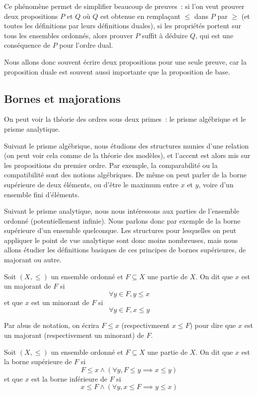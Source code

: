 Ce phénomène permet de simplifier beaucoup de preuves~: si l'on veut prouver
deux propositions $P$ et $Q$ où $Q$ est obtenue en remplaçant $\leq$ dans $P$
par $\geq$ (et toutes les définitions par leurs définitions duales), si les
propriétés portent sur tous les ensembles ordonnés, alors prouver $P$ suffit à
déduire $Q$, qui est une conséquence de $P$ pour l'ordre dual.

Nous allons donc souvent écrire deux propositions pour une seule preuve, car la
proposition duale est souvent aussi importante que la proposition de base.

\subsection{Bornes et majorations}

On peut voir la théorie des ordres sous deux primes~: le prisme algébrique et le
prisme analytique.

Suivant le prisme algébrique, nous étudions des structures
munies d'une relation (on peut voir cela comme de la théorie des modèles), et
l'accent est alors mis sur les propositions du premier ordre. Par exemple,
la comparabilité ou la compatibilité sont des notions algébriques. De même on
peut parler de la borne supérieure de deux éléments, ou d'être le maximum entre
$x$ et $y$, voire d'un ensemble fini d'éléments.

Suivant le prisme analytique, nous nous intéressons aux parties de l'ensemble
ordonné (potentiellement infinie). Nous parlons donc par exemple de la borne
supérieure d'un ensemble quelconque. Les structures pour lesquelles on peut
appliquer le point de vue analytique sont donc moins nombreuses, mais nous
allons étudier les définitions basiques de ces principes de bornes supérieures,
de majorant ou autre.

\begin{definition}
  Soit $(X,\leq)$ un ensemble ordonné et $F\subseteq X$ une partie de $X$. On
  dit que $x$ est un majorant de $F$ si
  \[\forall y\in F, y \leq x\]
  et que $x$ est un minorant de $F$ si
  \[\forall y\in F, x \leq y\]

  Par abus de notation, on écrira $F\leq x$ (respectivmeent $x\leq F$) pour dire
  que $x$ est un majorant (respectivement un minorant) de $F$.
\end{definition}

\begin{definition}
  Soit $(X,\leq)$ un ensemble ordonné et $F\subseteq X$ une partie de $X$. On
  dit que $x$ est la borne supérieure de $F$ si
  \[F\leq x \land (\forall y, F\leq y \implies x \leq y)\]
  et que $x$ est la borne inférieure de $F$ si
  \[x\leq F \land (\forall y, x\leq F \implies y \leq x)\]
\end{definition}

